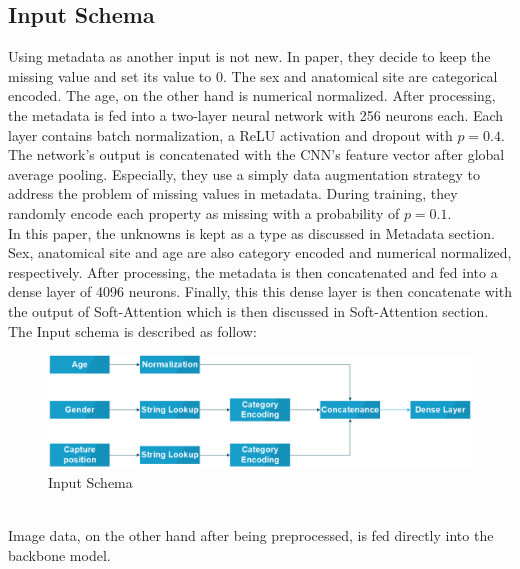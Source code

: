 \subsection{Input Schema}
Using metadata as another input is not new. In paper\cite{03910}, they decide to keep the missing value and set its value to $0$. The sex and anatomical site are categorical encoded. The age, on the other hand is numerical normalized. After processing, the metadata is fed into a two-layer neural network with 256 neurons each. Each layer contains batch normalization, a ReLU\cite{08375} activation and dropout with $p = 0.4$. The network’s output is concatenated with the CNN’s feature vector after global average pooling. Especially, they use a simply data augmentation strategy to address the problem of missing values in metadata. During training, they randomly encode each property as missing with a probability of $p = 0.1$. \\
In this paper, the unknowns is kept as a type as discussed in Metadata section. Sex, anatomical site and age are also category encoded and numerical normalized, respectively. After processing, the metadata is then concatenated and fed into a dense layer of 4096 neurons. Finally, this this dense layer is then concatenate with the output of Soft-Attention which is then discussed in Soft-Attention section. \\
The Input schema is described as follow:\\
\begin{figure}[h]
	\centering
	\includegraphics[width=0.7\linewidth]{"Diagram/Input Schema"}
	\caption{Input Schema}
	\label{fig:input-schema}
\end{figure}\\
Image data, on the other hand after being preprocessed, is fed directly into the backbone model. 

